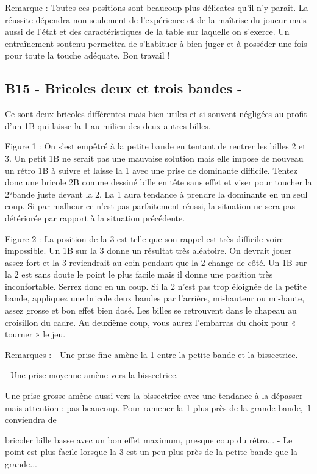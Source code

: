 Remarque : Toutes ces positions sont beaucoup plus délicates qu'il n'y
paraît. La réussite dépendra non seulement de l'expérience et de la
maîtrise du joueur mais aussi de l'état et des caractéristiques de la
table sur laquelle on s'exerce. Un entraînement soutenu permettra de
s'habituer à bien juger et à posséder une fois pour toute la touche
adéquate. Bon travail !

\subsection{B15 - Bricoles deux et trois bandes -
}\label{b15---bricoles-deux-et-trois-bandes--}

Ce sont deux bricoles différentes mais bien utiles et si souvent
négligées au profit d'un 1B qui laisse la 1 au milieu des deux autres
billes.

Figure 1 : On s'est empêtré à la petite bande en tentant de rentrer les
billes 2 et 3. Un petit 1B ne serait pas une mauvaise solution mais elle
impose de nouveau un rétro 1B à suivre et laisse la 1 avec une prise de
dominante difficile. Tentez donc une bricole 2B comme dessiné bille en
tête sans effet et viser pour toucher la 2°bande juste devant la 2. La 1
aura tendance à prendre la dominante en un seul coup. Si par malheur ce
n'est pas parfaitement réussi, la situation ne sera pas détériorée par
rapport à la situation précédente.

Figure 2 : La position de la 3 est telle que son rappel est très
difficile voire impossible. Un 1B sur la 3 donne un résultat très
aléatoire. On devrait jouer assez fort et la 3 reviendrait au coin
pendant que la 2 change de côté. Un 1B sur la 2 est sans doute le point
le plus facile mais il donne une position très inconfortable. Serrez
donc en un coup. Si la 2 n'est pas trop éloignée de la petite bande,
appliquez une bricole deux bandes par l'arrière, mi-hauteur ou mi-haute,
assez grosse et bon effet bien dosé. Les billes se retrouvent dans le
chapeau au croisillon du cadre. Au deuxième coup, vous aurez l'embarras
du choix pour « tourner » le jeu.

Remarques : - Une prise fine amène la 1 entre la petite bande et la
bissectrice.

- Une prise moyenne amène vers la bissectrice.

Une prise grosse amène aussi vers la bissectrice avec une tendance à la
dépasser mais attention : pas beaucoup. Pour ramener la 1 plus près de
la grande bande, il conviendra de

bricoler bille basse avec un bon effet maximum, presque coup du rétro...
- Le point est plus facile lorsque la 3 est un peu plus près de la
petite bande que la grande...

